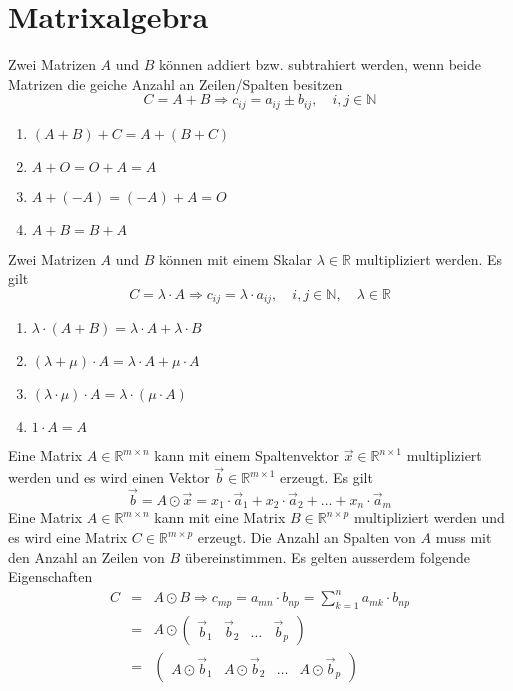 \section{Matrixalgebra}
Zwei Matrizen $A$ und $B$ können addiert bzw. subtrahiert werden, wenn beide Matrizen die geiche Anzahl an Zeilen/Spalten besitzen
\begin{equation}
\boxed{C=A+B\Rightarrow c_{ij}=a_{ij}\pm b_{ij},\quad i,j\in \mathbb{N}}
\end{equation}
\begin{enumerate}[$(i)$]
\item $\left(A+B\right)+C=A+\left(B+C\right)$
\item $A+O=O+A=A$
\item $A+(-A)=(-A)+A=O$
\item $A+B=B+A$
\end{enumerate}
Zwei Matrizen $A$ und $B$ können mit einem Skalar $\lambda\in\mathbb{R}$ multipliziert werden. Es gilt
\begin{equation}
\boxed{C=\lambda\cdot A\Rightarrow c_{ij}=\lambda\cdot a_{ij},\quad i,j\in\mathbb{N},\quad \lambda\in\mathbb{R}}
\end{equation}
\begin{enumerate}[$(i)$]
\item $\lambda\cdot \left(A+B\right)=\lambda\cdot A+\lambda\cdot B$
\item $\left(\lambda+\mu\right)\cdot A=\lambda\cdot A+\mu\cdot A$
\item $\left(\lambda\cdot \mu\right)\cdot A=\lambda\cdot\left(\mu\cdot A\right)$
\item $1\cdot A=A$
\end{enumerate}
Eine Matrix $A\in\mathbb{R}^{m\times n}$ kann mit einem Spaltenvektor $\overrightarrow{x}\in\mathbb{R}^{n\times 1}$ multipliziert werden und es wird einen Vektor $\overrightarrow{b}\in\mathbb{R}^{m\times 1}$ erzeugt. Es gilt
\begin{equation}
\boxed{\overrightarrow{b}=A\odot \overrightarrow{x}=x_1\cdot \overrightarrow{a}_1+x_2\cdot \overrightarrow{a}_2+\dotso+x_n\cdot \overrightarrow{a}_m}
\end{equation}
Eine Matrix $A\in\mathbb{R}^{m\times n}$ kann mit eine Matrix $B\in\mathbb{R}^{n\times p}$ multipliziert werden und es wird eine Matrix $C\in\mathbb{R}^{m\times p}$ erzeugt. Die Anzahl an Spalten von $A$ muss mit den Anzahl an Zeilen von $B$ übereinstimmen. Es gelten ausserdem folgende Eigenschaften
\begin{equation}
\boxed{\begin{array}{lll}
C&=&A\odot B\Rightarrow c_{mp}=a_{mn}\cdot b_{np}=\displaystyle \sum_{k=1}^na_{mk}\cdot b_{np}\\
&=&A\odot \begin{pmatrix}\overrightarrow{b}_1&\overrightarrow{b}_2&\dotso&\overrightarrow{b}_p\end{pmatrix}\\
&=&\begin{pmatrix}A\odot \overrightarrow{b}_1&A\odot \overrightarrow{b}_2&\dotso&A\odot \overrightarrow{b}_p\end{pmatrix}\\
\end{array}}
\end{equation}
